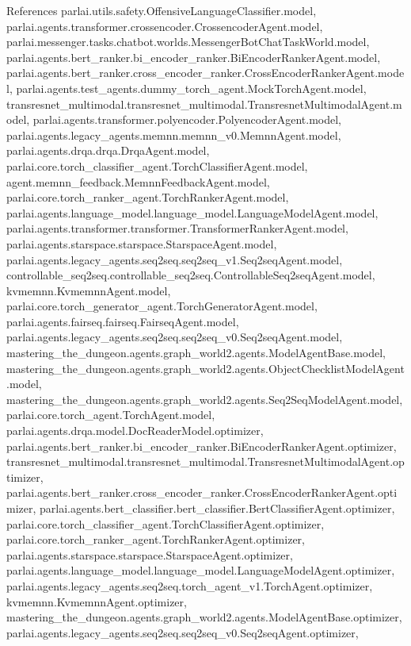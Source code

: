 References parlai.\+utils.\+safety.\+Offensive\+Language\+Classifier.\+model, parlai.\+agents.\+transformer.\+crossencoder.\+Crossencoder\+Agent.\+model, parlai.\+messenger.\+tasks.\+chatbot.\+worlds.\+Messenger\+Bot\+Chat\+Task\+World.\+model, parlai.\+agents.\+bert\+\_\+ranker.\+bi\+\_\+encoder\+\_\+ranker.\+Bi\+Encoder\+Ranker\+Agent.\+model, parlai.\+agents.\+bert\+\_\+ranker.\+cross\+\_\+encoder\+\_\+ranker.\+Cross\+Encoder\+Ranker\+Agent.\+model, parlai.\+agents.\+test\+\_\+agents.\+dummy\+\_\+torch\+\_\+agent.\+Mock\+Torch\+Agent.\+model, transresnet\+\_\+multimodal.\+transresnet\+\_\+multimodal.\+Transresnet\+Multimodal\+Agent.\+model, parlai.\+agents.\+transformer.\+polyencoder.\+Polyencoder\+Agent.\+model, parlai.\+agents.\+legacy\+\_\+agents.\+memnn.\+memnn\+\_\+v0.\+Memnn\+Agent.\+model, parlai.\+agents.\+drqa.\+drqa.\+Drqa\+Agent.\+model, parlai.\+core.\+torch\+\_\+classifier\+\_\+agent.\+Torch\+Classifier\+Agent.\+model, agent.\+memnn\+\_\+feedback.\+Memnn\+Feedback\+Agent.\+model, parlai.\+core.\+torch\+\_\+ranker\+\_\+agent.\+Torch\+Ranker\+Agent.\+model, parlai.\+agents.\+language\+\_\+model.\+language\+\_\+model.\+Language\+Model\+Agent.\+model, parlai.\+agents.\+transformer.\+transformer.\+Transformer\+Ranker\+Agent.\+model, parlai.\+agents.\+starspace.\+starspace.\+Starspace\+Agent.\+model, parlai.\+agents.\+legacy\+\_\+agents.\+seq2seq.\+seq2seq\+\_\+v1.\+Seq2seq\+Agent.\+model, controllable\+\_\+seq2seq.\+controllable\+\_\+seq2seq.\+Controllable\+Seq2seq\+Agent.\+model, kvmemnn.\+Kvmemnn\+Agent.\+model, parlai.\+core.\+torch\+\_\+generator\+\_\+agent.\+Torch\+Generator\+Agent.\+model, parlai.\+agents.\+fairseq.\+fairseq.\+Fairseq\+Agent.\+model, parlai.\+agents.\+legacy\+\_\+agents.\+seq2seq.\+seq2seq\+\_\+v0.\+Seq2seq\+Agent.\+model, mastering\+\_\+the\+\_\+dungeon.\+agents.\+graph\+\_\+world2.\+agents.\+Model\+Agent\+Base.\+model, mastering\+\_\+the\+\_\+dungeon.\+agents.\+graph\+\_\+world2.\+agents.\+Object\+Checklist\+Model\+Agent.\+model, mastering\+\_\+the\+\_\+dungeon.\+agents.\+graph\+\_\+world2.\+agents.\+Seq2\+Seq\+Model\+Agent.\+model, parlai.\+core.\+torch\+\_\+agent.\+Torch\+Agent.\+model, parlai.\+agents.\+drqa.\+model.\+Doc\+Reader\+Model.\+optimizer, parlai.\+agents.\+bert\+\_\+ranker.\+bi\+\_\+encoder\+\_\+ranker.\+Bi\+Encoder\+Ranker\+Agent.\+optimizer, transresnet\+\_\+multimodal.\+transresnet\+\_\+multimodal.\+Transresnet\+Multimodal\+Agent.\+optimizer, parlai.\+agents.\+bert\+\_\+ranker.\+cross\+\_\+encoder\+\_\+ranker.\+Cross\+Encoder\+Ranker\+Agent.\+optimizer, parlai.\+agents.\+bert\+\_\+classifier.\+bert\+\_\+classifier.\+Bert\+Classifier\+Agent.\+optimizer, parlai.\+core.\+torch\+\_\+classifier\+\_\+agent.\+Torch\+Classifier\+Agent.\+optimizer, parlai.\+core.\+torch\+\_\+ranker\+\_\+agent.\+Torch\+Ranker\+Agent.\+optimizer, parlai.\+agents.\+starspace.\+starspace.\+Starspace\+Agent.\+optimizer, parlai.\+agents.\+language\+\_\+model.\+language\+\_\+model.\+Language\+Model\+Agent.\+optimizer, parlai.\+agents.\+legacy\+\_\+agents.\+seq2seq.\+torch\+\_\+agent\+\_\+v1.\+Torch\+Agent.\+optimizer, kvmemnn.\+Kvmemnn\+Agent.\+optimizer, mastering\+\_\+the\+\_\+dungeon.\+agents.\+graph\+\_\+world2.\+agents.\+Model\+Agent\+Base.\+optimizer, parlai.\+agents.\+legacy\+\_\+agents.\+seq2seq.\+seq2seq\+\_\+v0.\+Seq2seq\+Agent.\+optimizer, 